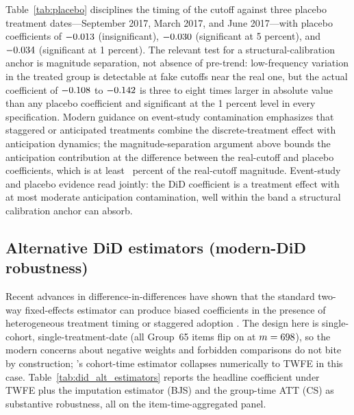 Table~\ref{tab:placebo} disciplines the timing of the cutoff against three placebo treatment dates---September 2017, March 2017, and June 2017---with placebo coefficients of $-0.013$ (insignificant), $-0.030$ (significant at 5 percent), and $-0.034$ (significant at 1 percent). The relevant test for a structural-calibration anchor is magnitude separation, not absence of pre-trend: low-frequency variation in the treated group is detectable at fake cutoffs near the real one, but the actual \policyCutoffMonth{} coefficient of $-0.108$ to $-0.142$ is three to eight times larger in absolute value than any placebo coefficient and significant at the 1 percent level in every specification. Modern guidance on event-study contamination \citep{borusyak2024, sun2021} emphasizes that staggered or anticipated treatments combine the discrete-treatment effect with anticipation dynamics; the magnitude-separation argument above bounds the anticipation contribution at the difference between the real-cutoff and placebo coefficients, which is at least \placeboMagnitudeRatio~percent of the real-cutoff magnitude. Event-study and placebo evidence read jointly: the DiD coefficient is a treatment effect with at most moderate anticipation contamination, well within the band a structural calibration anchor can absorb.

\subsection{Alternative DiD estimators (modern-DiD robustness)}\label{sec:did_alt}

Recent advances in difference-in-differences have shown that the standard two-way fixed-effects estimator can produce biased coefficients in the presence of heterogeneous treatment timing or staggered adoption \citep{borusyak2024, callaway2021, sun2021}. The design here is single-cohort, single-treatment-date (all Group~65 items flip on at $m = 698$), so the modern concerns about negative weights and forbidden comparisons do not bite by construction; \citet{sun2021}'s cohort-time estimator collapses numerically to TWFE in this case. Table~\ref{tab:did_alt_estimators} reports the headline coefficient under TWFE plus the \citet{borusyak2024} imputation estimator (BJS) and the \citet{callaway2021} group-time ATT (CS) as substantive robustness, all on the item-time-aggregated panel.



